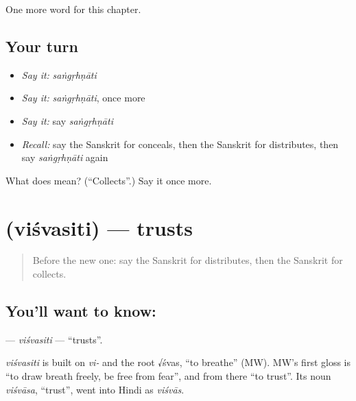 \begin{grammarlens}[title={What you've built}]
One more word for this chapter.
\end{grammarlens}

\subsection*{Your turn}
\begin{itemize}
\raggedright
  \item \emph{Say it:} \emph{saṅgṛhṇāti}
  \item \emph{Say it:} \emph{saṅgṛhṇāti}, once more
  \item \emph{Say it:} say \emph{saṅgṛhṇāti}
  \item \emph{Recall:} say the Sanskrit for conceals, then the Sanskrit for distributes, then say \emph{saṅgṛhṇāti} again
\end{itemize}

\begin{tcolorbox}[breakable,colback=teal!4,colframe=teal!35!black,title={Before you move on}]
What does  mean? (\textquotedblleft{}Collects\textquotedblright{}.) Say it once more.
\end{tcolorbox}
\section[\texorpdfstring{\sk{विश्वसिति} (viśvasiti)}{विश्वसिति (viśvasiti)}]{ (viśvasiti) — trusts}

\label{lesson:SA-C177-visvasiti}



\begin{quote}
Before the new one: say the Sanskrit for distributes, then the Sanskrit for collects.
\end{quote}

\subsection*{You'll want to know: }
\textbf{} — \emph{viśvasiti} — \textquotedblleft{}trusts\textquotedblright{}.

\begin{cousinweb}
\emph{viśvasiti} is built on \emph{vi-} and the root √śvas, \textquotedblleft{}to breathe\textquotedblright{} (MW). MW's first gloss is \textquotedblleft{}to draw breath freely, be free from fear\textquotedblright{}, and from there \textquotedblleft{}to trust\textquotedblright{}. Its noun \emph{viśvāsa}, \textquotedblleft{}trust\textquotedblright{}, went into Hindi as \emph{viśvās}.
\end{cousinweb}

